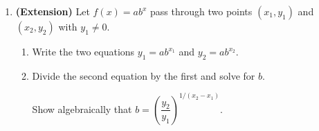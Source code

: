 \documentclass[10pt]{article}
\begin{document}
\begin{enumerate}[itemsep=16pt]
      \vspace{0.06in}
      \leavevmode{}\phantom{Answer:} \gradedblank[id=hw5a, type=choice, points=1, answer=B]{1.5cm}{13pt} \quad Explain:
      \rubricbox{\gradedblank[id=hw5b, type=rubric, points=2,
  display={Table B: consecutive ratios are all 2 ($6/3 = 12/6 = 24/12$), so outputs change proportionally: exponential.}]{\linewidth}{20pt}}

\item \textbf{(Extension)} Let $f(x) = ab^x$ pass through two points $(x_1, y_1)$ and
      $(x_2, y_2)$ with $y_1 \ne 0$.

      \begin{enumerate}[label=(\alph*), itemsep=8pt]
        \item Write the two equations $y_1 = ab^{x_1}$ and $y_2 = ab^{x_2}$.

        \item Divide the second equation by the first and solve for $b$.

              \vspace{0.06in}
              Show algebraically that $b = \left(\dfrac{y_2}{y_1}\right)^{1/(x_2 - x_1)}$.

              \vspace{0.8in}
      \end{enumerate}

\end{enumerate}
\end{document}
